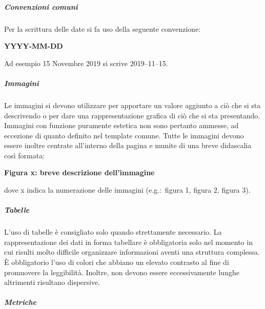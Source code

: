 \documentclass[../../norme-di-progetto.tex]{subfiles}
\begin{document}
\subparagraph{Convenzioni comuni}%
\label{subp:convenzioni_comuni}
Per la scrittura delle date si fa uso della seguente convenzione:
\begin{center}
  \textbf{YYYY-MM-DD}
\end{center}
Ad esempio 15 Novembre 2019 si scrive 2019--11--15.

\subparagraph{Immagini}%
\label{subp:immagini}
Le immagini si devono utilizzare per apportare un valore aggiunto a ciò che si sta descrivendo o per dare una rappresentazione grafica di ciò che si sta presentando.
Immagini con funzione puramente estetica non sono pertanto ammesse, ad eccezione di quanto definito nel template comune.
Tutte le immagini devono essere inoltre centrate all'interno della pagina e munite di una breve didascalia così formata:
\begin{center}
  \textbf{Figura x: breve descrizione dell'immagine}
\end{center}
dove x indica la numerazione delle immagini (e.g.:\ figura 1, figura 2, figura 3).

\subparagraph{Tabelle}%
\label{subp:tabelle}
L'uso di tabelle è consigliato solo quando strettamente necessario. La rappresentazione dei dati in forma tabellare è obbligatoria solo nel momento in cui risulti molto difficile organizzare informazioni aventi una struttura complessa. È obbligatorio l'uso di colori che abbiano un elevato contrasto al fine di promuovere la leggibilità. Inoltre, non devono essere eccessivamente lunghe altrimenti risultano dispersive.

\subparagraph{Metriche}%
\label{subp:metriche}
\end{document}
